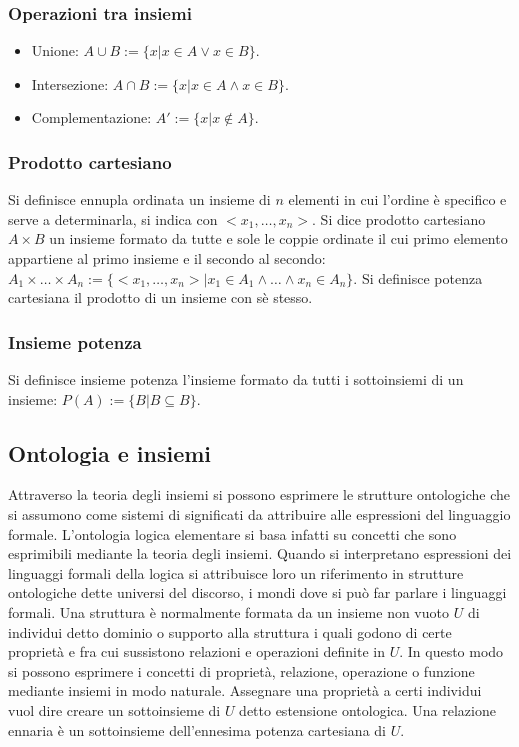 \subsubsection{Operazioni tra insiemi}
\begin{itemize}
\item Unione: $A\cup B:=\{x|x\in A\lor x\in B\}$.
\item Intersezione: $A\cap B:=\{x|x\in A\land x\in B\}$.
\item Complementazione: $A':=\{x|x\not\in A\}$.
\end{itemize}
\subsubsection{Prodotto cartesiano}
Si definisce ennupla ordinata un insieme di $n$ elementi in cui l'ordine \`e specifico e serve a determinarla, si indica con $<x_1, \dots, x_n>$. Si dice prodotto cartesiano $A\times B$ un insieme formato da 
tutte e sole le coppie ordinate il cui primo elemento appartiene al primo insieme e il secondo al secondo: $A_1\times\dots\times A_n:=\{<x_1,\dots,  x_n>|x_1\in A_1\land\dots\land x_n\in A_n\}$. Si definisce 
potenza cartesiana il prodotto di un insieme con s\`e stesso.
\subsubsection{Insieme potenza}
Si definisce insieme potenza l'insieme formato da tutti i sottoinsiemi di un insieme: $P(A):=\{B|B\subseteq B\}$. 
\subsection{Ontologia e insiemi}
Attraverso la teoria degli insiemi si possono esprimere le strutture ontologiche che si assumono come sistemi di significati da attribuire alle espressioni del linguaggio formale. L'ontologia logica elementare si 
basa infatti su concetti che sono esprimibili mediante la teoria degli insiemi. Quando si interpretano espressioni dei linguaggi formali della logica si attribuisce loro un riferimento in strutture ontologiche dette 
universi del discorso, i mondi dove si pu\`o far parlare i linguaggi formali. Una struttura \`e normalmente formata da un insieme non vuoto $U$ di individui detto dominio o supporto alla struttura i quali godono 
di certe propriet\`a e fra cui sussistono relazioni e operazioni definite in $U$. In questo modo si possono esprimere i concetti di propriet\`a, relazione, operazione o funzione mediante insiemi in modo naturale. 
Assegnare una propriet\`a a certi individui vuol dire creare un sottoinsieme di $U$ detto estensione ontologica. Una relazione ennaria \`e un sottoinsieme dell'ennesima potenza cartesiana di $U$.
